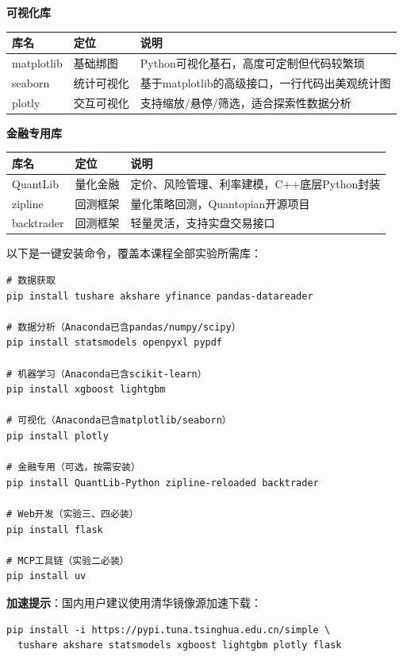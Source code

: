 \textbf{可视化库}

\begin{table}[H]
\centering
\small
\begin{tabular}{llp{6cm}}
\toprule
\textbf{库名} & \textbf{定位} & \textbf{说明} \\
\midrule
matplotlib & 基础绑图 & Python可视化基石，高度可定制但代码较繁琐 \\
seaborn & 统计可视化 & 基于matplotlib的高级接口，一行代码出美观统计图 \\
plotly & 交互可视化 & 支持缩放/悬停/筛选，适合探索性数据分析 \\
\bottomrule
\end{tabular}
\end{table}

\textbf{金融专用库}

\begin{table}[H]
\centering
\small
\begin{tabular}{llp{6cm}}
\toprule
\textbf{库名} & \textbf{定位} & \textbf{说明} \\
\midrule
QuantLib & 量化金融 & 定价、风险管理、利率建模，C++底层Python封装 \\
zipline & 回测框架 & 量化策略回测，Quantopian开源项目 \\
backtrader & 回测框架 & 轻量灵活，支持实盘交易接口 \\
\bottomrule
\end{tabular}
\end{table}

\begin{practicebox}[金融专业推荐安装清单]
以下是一键安装命令，覆盖本课程全部实验所需库：

\begin{lstlisting}[style=shell]
# 数据获取
pip install tushare akshare yfinance pandas-datareader

# 数据分析（Anaconda已含pandas/numpy/scipy）
pip install statsmodels openpyxl pypdf

# 机器学习（Anaconda已含scikit-learn）
pip install xgboost lightgbm

# 可视化（Anaconda已含matplotlib/seaborn）
pip install plotly

# 金融专用（可选，按需安装）
pip install QuantLib-Python zipline-reloaded backtrader

# Web开发（实验三、四必装）
pip install flask

# MCP工具链（实验二必装）
pip install uv
\end{lstlisting}

\textbf{加速提示}：国内用户建议使用清华镜像源加速下载：
\begin{lstlisting}[style=shell]
pip install -i https://pypi.tuna.tsinghua.edu.cn/simple \
  tushare akshare statsmodels xgboost lightgbm plotly flask
\end{lstlisting}
\end{practicebox}

